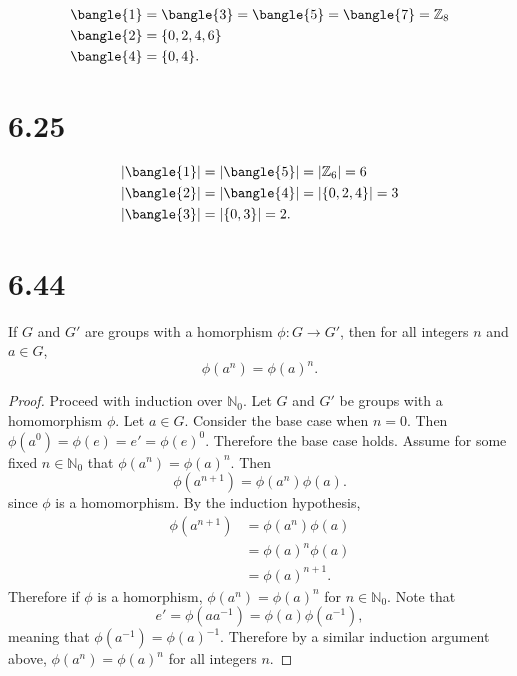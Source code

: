 \documentclass[12pt]{extarticle}
\begin{document}
\begin{multicols}{2}
\begin{align*}
	\bangle{1} &= \bangle{3} = \bangle{5} = \bangle{7} = \mathbb{Z}_8 \\
	\bangle{2} &= \qty{0,2,4,6} \\
	\bangle{4} &= \qty{0,4}
.\end{align*}
\columnbreak
\begin{center}
\end{center}
\end{multicols}

\section*{6.25}
{
	\newcommand\temp[1]{|\bangle{#1}|}
	\begin{align*}
		\temp{1} &= \temp{5} = |\mathbb{Z}_6| = 6 \\
		\temp{2} &= \temp{4} = \qty|\qty{0,2,4}| = 3 \\
		\temp{3} &= \qty|\qty{0,3}| = 2
	.\end{align*}
}

\section*{6.44}
\begin{lemma}
	\label{lem:homomorphicexponent}
	If $G$ and $G'$ are groups with a homorphism $\phi : G \to G'$, then for all integers $n$ and $a \in G$,
	\[
		\phi(a^n) = \phi(a)^n
	.\]
\end{lemma}
\begin{proof}
	Proceed with induction over $\mathbb{N}_0$. Let $G$ and $G'$ be groups with a homomorphism $\phi$. Let $a \in G$. Consider the base case when $n = 0$. Then $\phi(a^0) = \phi(e) = e' = \phi(e)^0$. Therefore the base case holds. Assume for some fixed $n \in \mathbb{N}_0$ that $\phi(a^n) = \phi(a)^n$. Then
	\[
		\phi(a^{n+1}) = \phi(a^n) \phi(a)
	.\]
	since $\phi$ is a homomorphism. By the induction hypothesis,
	\begin{align*}
		\phi(a^{n+1}) &= \phi(a^n) \phi(a) \\
		&= \phi(a)^n \phi(a) \\
		&= \phi(a)^{n+1}
	.\end{align*}
	Therefore if $\phi$ is a homorphism, $\phi(a^n) = \phi(a)^n$ for $n \in \mathbb{N}_0$. Note that
	\[
		e' = \phi(aa^{-1}) = \phi(a) \phi(a^{-1})
	,\]
	meaning that $\phi(a^{-1}) = \phi(a)^{-1}$. Therefore by a similar induction argument above, $\phi(a^n) = \phi(a)^n$ for all integers $n$.
\end{proof}
\end{document}
